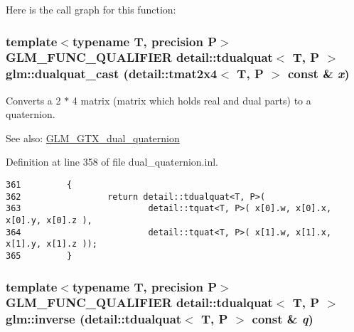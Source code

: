 Here is the call graph for this function:\hypertarget{group__gtc__dual__quaternion_gacea24f869d7e991fafcee55641595ec}{
\subsubsection[dualquat\_\-cast]{\setlength{\rightskip}{0pt plus 5cm}template$<$typename T, precision P$>$ GLM\_\-FUNC\_\-QUALIFIER detail::tdualquat$<$ T, P $>$ glm::dualquat\_\-cast (detail::tmat2x4$<$ T, P $>$ const \& {\em x})}}
\label{group__gtc__dual__quaternion_gacea24f869d7e991fafcee55641595ec}


Converts a 2 $\ast$ 4 matrix (matrix which holds real and dual parts) to a quaternion.

\begin{Desc}
\item[See also:]\hyperlink{group__gtc__dual__quaternion}{GLM\_\-GTX\_\-dual\_\-quaternion} \end{Desc}


Definition at line 358 of file dual\_\-quaternion.inl.

\begin{Code}\begin{verbatim}361         {
362                 return detail::tdualquat<T, P>(
363                         detail::tquat<T, P>( x[0].w, x[0].x, x[0].y, x[0].z ),
364                         detail::tquat<T, P>( x[1].w, x[1].x, x[1].y, x[1].z ));
365         }
\end{verbatim}
\end{Code}


\hypertarget{group__gtc__dual__quaternion_g793733e8cc7644ec2ff32a1007e85282}{
\subsubsection[inverse]{\setlength{\rightskip}{0pt plus 5cm}template$<$typename T, precision P$>$ GLM\_\-FUNC\_\-QUALIFIER detail::tdualquat$<$ T, P $>$ glm::inverse (detail::tdualquat$<$ T, P $>$ const \& {\em q})}}
\label{group__gtc__dual__quaternion_g793733e8cc7644ec2ff32a1007e85282}


